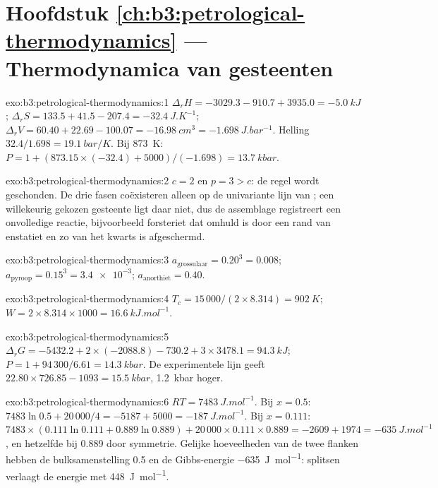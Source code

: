 \section*{Hoofdstuk \ref{ch:b3:petrological-thermodynamics} --- Thermodynamica van gesteenten}

\begin{solution}{exo:b3:petrological-thermodynamics:1}
$\Delta_rH = -3029.3 - 910.7 + 3935.0 = \qty{-5.0}{kJ}$; $\Delta_rS = 133.5 +
41.5 - 207.4 = \qty{-32.4}{J.K^{-1}}$; $\Delta_rV = 60.40 + 22.69 - 100.07 =
\qty{-16.98}{cm^3} = \qty{-1.698}{J.bar^{-1}}$. Helling $32.4/1.698 =
\qty{19.1}{bar/K}$. Bij \qty{873}{K}: $P = 1 + (873.15\times(-32.4) +
5000)/(-1.698) = \qty{13.7}{kbar}$.
\end{solution}

\begin{solution}{exo:b3:petrological-thermodynamics:2}
$c = 2$ en $p = 3 > c$: de regel wordt geschonden. De drie fasen coëxisteren alleen
op de univariante lijn van ; een willekeurig
gekozen gesteente ligt daar niet, dus de assemblage registreert een onvolledige
reactie, bijvoorbeeld forsteriet dat omhuld is door een rand van enstatiet en
zo van het kwarts is afgeschermd.
\end{solution}

\begin{solution}{exo:b3:petrological-thermodynamics:3}
$a_{\text{grossulaar}} = 0.20^3 = 0.008$; $a_{\text{pyroop}} = 0.15^3 =
\num{3.4e-3}$; $a_{\text{anorthiet}} = 0.40$.
\end{solution}

\begin{solution}{exo:b3:petrological-thermodynamics:4}
$T_c = 15\,000/(2\times8.314) = \qty{902}{K}$; $W = 2\times8.314\times1000
= \qty{16.6}{kJ.mol^{-1}}$.
\end{solution}

\begin{solution}{exo:b3:petrological-thermodynamics:5}
$\Delta_rG = -5432.2 + 2\times(-2088.8) - 730.2 + 3\times3478.1 =
\qty{94.3}{kJ}$; $P = 1 + 94\,300/6.61 = \qty{14.3}{kbar}$. De experimentele
lijn geeft $22.80\times726.85 - 1093 = \qty{15.5}{kbar}$, \qty{1.2}{kbar}
hoger.
\end{solution}

\begin{solution}{exo:b3:petrological-thermodynamics:6}
$RT = \qty{7483}{J.mol^{-1}}$. Bij $x = 0.5$: $7483\ln0.5 + 20\,000/4 = -5187 +
5000 = \qty{-187}{J.mol^{-1}}$. Bij $x = 0.111$: $7483\times(0.111\ln0.111 +
0.889\ln0.889) + 20\,000\times0.111\times0.889 = -2609 + 1974 =
\qty{-635}{J.mol^{-1}}$, en hetzelfde bij 0.889 door symmetrie. Gelijke
hoeveelheden van de twee flanken hebben de bulksamenstelling 0.5 en de Gibbs-energie
\qty{-635}{J.mol^{-1}}: splitsen verlaagt de energie met \qty{448}{J.mol^{-1}}.
\end{solution}

